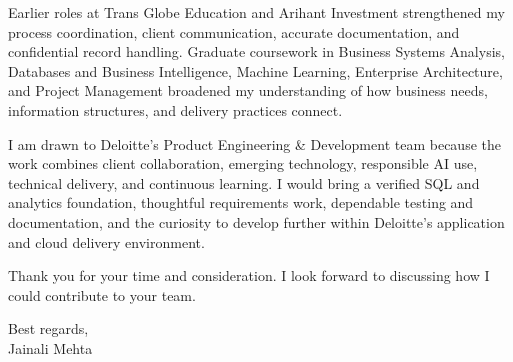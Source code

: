 \documentclass[letterpaper,10pt]{article}
\begin{document}
Earlier roles at Trans Globe Education and Arihant Investment strengthened my process coordination, client communication, accurate documentation, and confidential record handling. Graduate coursework in Business Systems Analysis, Databases and Business Intelligence, Machine Learning, Enterprise Architecture, and Project Management broadened my understanding of how business needs, information structures, and delivery practices connect.

I am drawn to Deloitte's Product Engineering \& Development team because the work combines client collaboration, emerging technology, responsible AI use, technical delivery, and continuous learning. I would bring a verified SQL and analytics foundation, thoughtful requirements work, dependable testing and documentation, and the curiosity to develop further within Deloitte's application and cloud delivery environment.

Thank you for your time and consideration. I look forward to discussing how I could contribute to your team.

Best regards,\\[8pt]
Jainali Mehta
\end{document}
